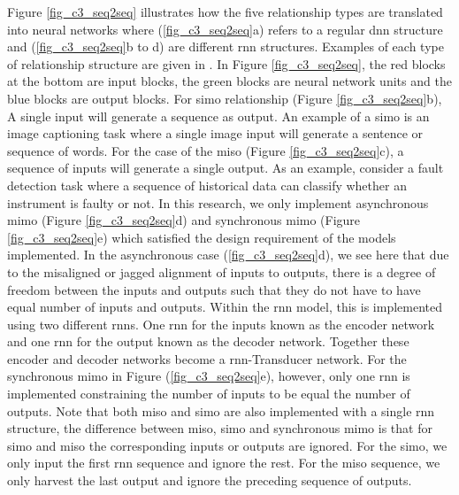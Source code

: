 Figure \ref{fig_c3_seq2seq} illustrates how the five  relationship types are translated into neural networks where (\ref{fig_c3_seq2seq}a) refers to a regular \acrshort{dnn} structure and (\ref{fig_c3_seq2seq}b to d) are different \acrshort{rnn} structures. Examples of each type of relationship structure are given in \cite{karpathy2015unreasonable}.  In Figure \ref{fig_c3_seq2seq}, the red blocks at the bottom are input blocks, the green blocks are neural network units and the blue blocks are output blocks.  For \acrshort{simo} relationship (Figure \ref{fig_c3_seq2seq}b), A single input will generate a sequence as output. An example of a \acrshort{simo} is an image captioning task where a single image input will generate a sentence or sequence of words. For the case of the \acrshort{miso} (Figure \ref{fig_c3_seq2seq}c), a sequence of inputs will generate a single output.  As an example, consider a fault detection task where a sequence of historical data can classify whether an instrument is faulty or not.  In this research, we only implement asynchronous \acrshort{mimo} (Figure \ref{fig_c3_seq2seq}d) and synchronous \acrshort{mimo} (Figure \ref{fig_c3_seq2seq}e) which satisfied the design requirement of the models implemented. In the asynchronous case (\ref{fig_c3_seq2seq}d), we see here that due to the misaligned or jagged alignment of inputs to outputs, there is a degree of freedom between the inputs and outputs such that they do not have to have equal number of inputs and outputs.  Within the \acrshort{rnn} model, this is implemented using two different \acrlong{rnn}s. One \acrshort{rnn} for the inputs known as the encoder network and one \acrshort{rnn} for the output known as the decoder network.  Together these encoder and decoder networks become a \acrshort{rnn}-Transducer network.   For the synchronous \acrshort{mimo} in Figure (\ref{fig_c3_seq2seq}e), however, only one \acrshort{rnn} is implemented constraining the number of inputs to be equal the number of outputs.  Note that both \acrshort{miso} and \acrshort{simo} are also implemented with a single \acrshort{rnn} structure, the difference between \acrshort{miso}, \acrshort{simo} and synchronous \acrshort{mimo} is that for \acrshort{simo} and \acrshort{miso} the corresponding inputs or outputs are ignored.  For the \acrshort{simo}, we only input the first \acrshort{rnn} sequence and ignore the rest.  For the \acrshort{miso} sequence, we only harvest the last output and ignore the preceding sequence of outputs.  

